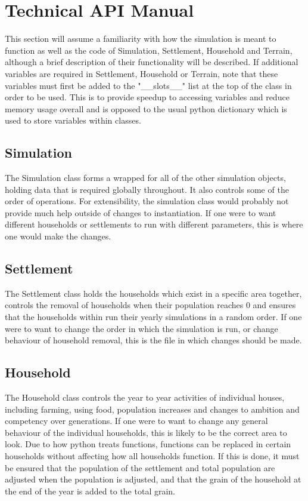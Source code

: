 \documentclass[12pt]{article}
\begin{document}
	\section{Technical API Manual}
		This section will assume a familiarity with how the simulation is meant to function as well as the code of Simulation, Settlement, Household and Terrain, although a brief description of their functionality will be described. If additional variables are required in Settlement, Household or Terrain, note that these variables must first be added to the "\_\_slots\_\_" list at the top of the class in order to be used. This is to provide speedup to accessing variables and reduce memory usage overall and is opposed to the usual python dictionary which is used to store variables within classes.
			\subsection{Simulation}
				The Simulation class forms a wrapped for all of the other simulation objects, holding data that is required globally throughout. It also controls some of the order of operations. For extensibility, the simulation class would probably not provide much help outside of changes to instantiation. If one were to want different households or settlements to run with different parameters, this is where one would make the changes.
			\subsection{Settlement}
				The Settlement class holds the households which exist in a specific area together, controls the removal of households when their population reaches 0 and ensures that the households within run their yearly simulations in a random order. If one were to want to change the order in which the simulation is run, or change behaviour of household removal, this is the file in which changes should be made.
			\subsection{Household}
				The Household class controls the year to year activities of individual houses, including farming, using food, population increases and changes to ambition and competency over generations. If one were to want to change any general behaviour of the individual households, this is likely to be the correct area to look. Due to how python treats functions, functions can be replaced in certain households without affecting how all households function. If this is done, it must be ensured that the population of the settlement and total population are adjusted when the population is adjusted, and that the grain of the household at the end of the year is added to the total grain.
\end{document}

